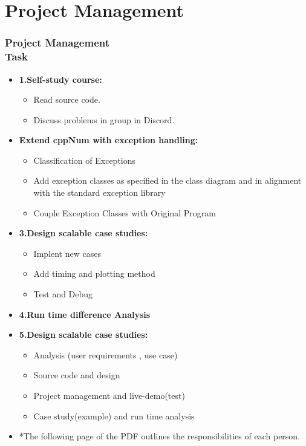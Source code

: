 \documentclass[ucs,10pt]{beamer}
\begin{document}
\section{Project Management}

\begin{frame}
\frametitle{Project Management \\
	\small \color{rwth-blue} Task}
	\begin{itemize}	
            \item \textbf{1.Self-study course:}
				\begin{itemize}
					\item Read source code.
					\item Discuss problems in group in Discord.
				\end{itemize}
			\item \textbf{Extend cppNum with exception handling:}
				\begin{itemize}
					\item Classification of Exceptions
					\item Add exception classes as specified in the class diagram and in alignment with the standard exception library
					\item Couple Exception Classes with Original Program
				\end{itemize}
			\item \textbf{3.Design scalable case studies:}
				\begin{itemize}
				\item Implent new cases
				\item Add timing and plotting method
				\item Test and Debug
				\end{itemize}
			\item \textbf{4.Run time difference Analysis}
			\item \textbf{5.Design scalable case studies:}
				\begin{itemize}
				\item Analysis (user requirements , use case)
				\item Source code and design
				\item Project management and live-demo(test)
				\item Case study(example) and run time analysis
				\end{itemize}
			\item *The following page of the PDF outlines the responsibilities of each person.
	\end{itemize}
\end{frame}
\end{document}
